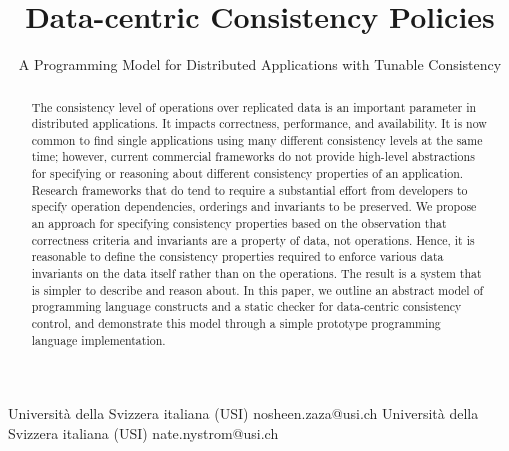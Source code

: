 \documentclass[preprint,numbers]{sigplanconf}
\begin{document}
\setlength{\pdfpageheight}{\paperheight}
\setlength{\pdfpagewidth}{\paperwidth}





\title{Data-centric Consistency Policies}
\subtitle{A Programming Model for Distributed Applications with Tunable Consistency}

           {Universit\`a della Svizzera italiana (USI)}
           {nosheen.zaza@usi.ch}
           {Universit\`a della Svizzera italiana (USI)}
           {nate.nystrom@usi.ch}

\maketitle

\begin{abstract}
The consistency level of operations over replicated data is 
an important parameter in distributed applications. It impacts correctness, 
performance, and availability. It is now common to find single applications
using many different consistency
levels at the same time; however, current commercial frameworks do not
provide high-level abstractions for specifying or reasoning about different
consistency properties of an application. Research frameworks that do tend to require a
substantial effort from developers to specify operation dependencies, orderings
and invariants to be preserved.
We propose an approach for specifying consistency properties based on the
observation that
correctness criteria and invariants are a property of data, not operations.
Hence, it is reasonable to define the consistency properties
required to enforce various data invariants on the data itself rather than on the operations. 
The result is a system that is simpler to describe and reason about. 
In this paper, we outline an abstract model of programming language constructs
and a static checker for data-centric consistency control, and demonstrate
this model through a simple prototype programming language implementation.
\end{abstract}
\end{document}
